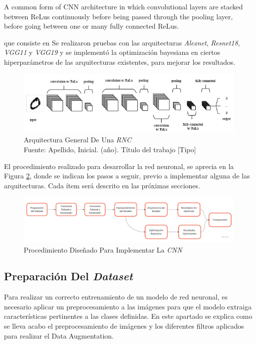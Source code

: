  A common form of CNN architecture in which convolutional layers are
stacked between ReLus continuously before being passed through the pooling
layer, before going between one or many fully connected ReLus.


 que consiste en  
Se realizaron pruebas con las arquitecturas \textit{Alexnet}, \textit{Resnet18}, \textit{VGG11} y \textit{VGG19} y se implementó la optimización bayesiana en ciertos hiperparámetros de las arquitecturas existentes, para mejorar los resultados. 

\begin{figure}[ht]
	\centering
	\includegraphics[scale=0.6]{Figs/A-generic-CNN-Architecture.png}	
	\caption{Arquitectura General De Una \textit{RNC} \\ Fuente: Apellido, Inicial. (año). Título del trabajo [Tipo]} 
	\label{fig:cnnarchitecture}
\end{figure}	

El procedimiento realizado para desarrollar la red neuronal, se aprecia en la Figura \ref{fig:procedimiento}, donde se indican los pasos a seguir, previo a implementar alguna de las arquitecturas. Cada ítem será descrito en las próximas secciones.  

\begin{figure}[ht]
	\centering
	\includegraphics[scale=0.15]{Figs/procedimiento.jpg}
	\caption{Procedimiento Diseñado Para Implementar La \textit{CNN}}
	\label{fig:procedimiento}
\end{figure}	


\newpage
\subsection{Preparación Del \textit{Dataset}}

Para realizar un correcto entrenamiento de un modelo de red neuronal, es necesario aplicar un preprocesamiento a las imágenes para que el modelo extraiga características pertinentes a las clases definidas. En este apartado se explica como se lleva acabo el preprocesamiento de imágenes y los diferentes filtros aplicados para realizar el Data Augmentation.

